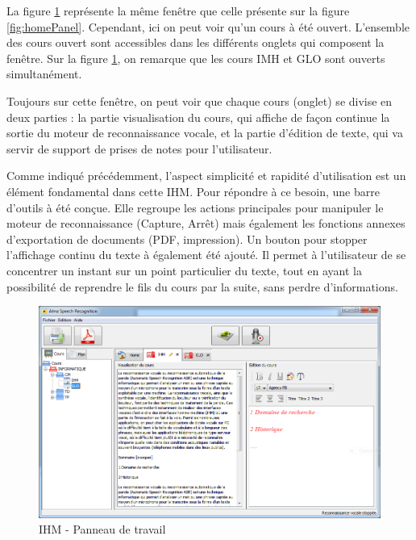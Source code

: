 La figure \ref{fig:workPanel} représente la même fenêtre que celle présente sur la figure \ref{fig:homePanel}. Cependant, ici on peut voir qu'un cours à été ouvert. L'ensemble des cours ouvert sont accessibles dans les différents onglets qui composent la fenêtre. Sur la figure \ref{fig:workPanel}, on remarque que les cours IMH et GLO sont ouverts simultanément.

Toujours sur cette fenêtre, on peut voir que chaque cours (onglet) se divise en deux parties : la partie visualisation du cours, qui affiche de façon continue la sortie du moteur de reconnaissance vocale, et la partie d'édition de texte, qui va servir de support de prises de notes pour l'utilisateur. 

Comme indiqué précédemment, l'aspect simplicité et rapidité d'utilisation est un élément fondamental dans cette IHM. Pour répondre à ce besoin, une barre d'outils à été conçue. Elle regroupe les actions principales pour manipuler le moteur de reconnaissance (Capture, Arrêt) mais également les fonctions annexes d'exportation de documents (PDF, impression). Un bouton pour stopper l'affichage continu du texte à également été ajouté. Il permet à l'utilisateur de se concentrer un instant sur un point particulier du texte, tout en ayant la possibilité de reprendre le fils du cours par la suite, sans perdre d'informations.



\begin{figure}[H]
 \centering
 \includegraphics[scale=0.6]{./images/workPanel.png}
 \caption{IHM - Panneau de travail}
 \label{fig:workPanel}
\end{figure}




